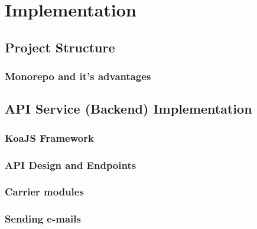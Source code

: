 \chapter{Implementation}
\label{chap:implementation}

\section{Project Structure}
\label{sec:project-structure}

\subsection{Monorepo and it's advantages}
\label{subsec:monorepo-advantages}

\section{API Service (Backend) Implementation}
\label{sec:api-service-implementation}

\subsection{KoaJS Framework}
\label{subsec:koajs-framework}


\subsection{API Design and Endpoints}
\label{subsec:api-design-endpoints}

\subsection{Carrier modules}

\subsection{Sending e-mails}

